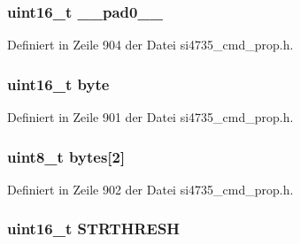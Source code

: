 \subsubsection[{\+\_\+\+\_\+pad0\+\_\+\+\_\+}]{\setlength{\rightskip}{0pt plus 5cm}uint16\+\_\+t \+\_\+\+\_\+pad0\+\_\+\+\_\+}\label{unionfm__blend__multi__stereo__thres_a77132c2c26a75f5b8751b235cda23828}


Definiert in Zeile 904 der Datei si4735\+\_\+cmd\+\_\+prop.\+h.

\hypertarget{unionfm__blend__multi__stereo__thres_ab0549c1b5ea980a02e7eab77e21fea49}{}
\subsubsection[{byte}]{\setlength{\rightskip}{0pt plus 5cm}uint16\+\_\+t byte}\label{unionfm__blend__multi__stereo__thres_ab0549c1b5ea980a02e7eab77e21fea49}


Definiert in Zeile 901 der Datei si4735\+\_\+cmd\+\_\+prop.\+h.

\hypertarget{unionfm__blend__multi__stereo__thres_a46e4c05d20a047ec169f60d3167e912e}{}
\subsubsection[{bytes}]{\setlength{\rightskip}{0pt plus 5cm}uint8\+\_\+t bytes\mbox{[}2\mbox{]}}\label{unionfm__blend__multi__stereo__thres_a46e4c05d20a047ec169f60d3167e912e}


Definiert in Zeile 902 der Datei si4735\+\_\+cmd\+\_\+prop.\+h.

\hypertarget{unionfm__blend__multi__stereo__thres_ae59cc6ed2c20ceb75c5065984e1751d1}{}
\subsubsection[{S\+T\+R\+T\+H\+R\+E\+S\+H}]{\setlength{\rightskip}{0pt plus 5cm}uint16\+\_\+t S\+T\+R\+T\+H\+R\+E\+S\+H}\label{unionfm__blend__multi__stereo__thres_ae59cc6ed2c20ceb75c5065984e1751d1}


